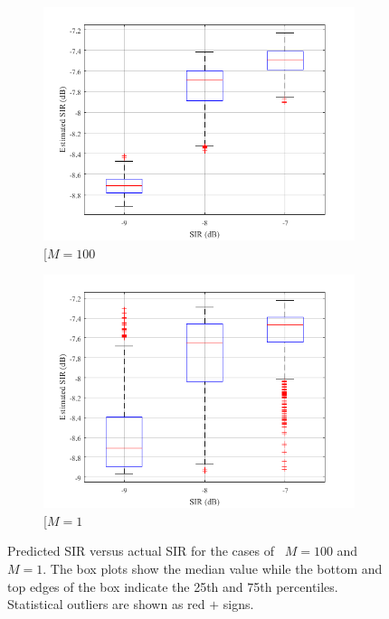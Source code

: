 \begin{figure}[!ht]
	\begin{subfigure}{.5\textwidth}
		\centering
		\includegraphics[width=.8\linewidth]{./chapter-ftml/plots/BP_1}  
		\caption{[$M=100$}
		\label{ftml-conf:fig:results-BP-1}
	\end{subfigure}
	\begin{subfigure}{.5\textwidth}
		\centering
		\includegraphics[width=.8\linewidth]{./chapter-ftml/plots/BP_2}  
		\caption{[$M=1$}
		\label{ftml-conf:fig:results-BP-2}
	\end{subfigure}
	\caption{Predicted SIR versus actual SIR for the cases of~\protect{} $M=100$ and~\protect{} $M=1$. The box plots show the median value while the bottom and top edges of the box indicate the 25th and 75th percentiles.  Statistical outliers are shown as red $+$ signs.}
	\label{ftml-conf:fig:results-BP}
\end{figure}

